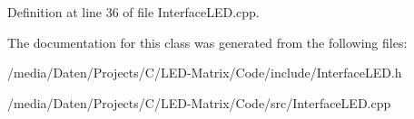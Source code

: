 Definition at line 36 of file Interface\-L\-E\-D.\-cpp.



The documentation for this class was generated from the following files\-:\begin{DoxyCompactItemize}
\item 
/media/\-Daten/\-Projects/\-C/\-L\-E\-D-\/\-Matrix/\-Code/include/Interface\-L\-E\-D.\-h\item 
/media/\-Daten/\-Projects/\-C/\-L\-E\-D-\/\-Matrix/\-Code/src/Interface\-L\-E\-D.\-cpp\end{DoxyCompactItemize}
